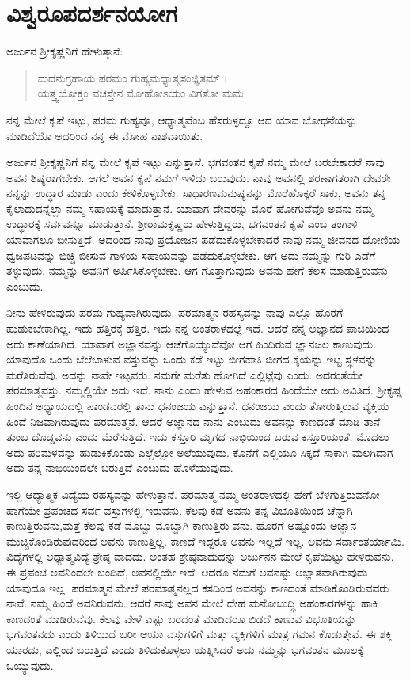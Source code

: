 
\chapter{ವಿಶ್ವರೂಪದರ್ಶನಯೋಗ}

ಅರ್ಜುನ ಶ್ರೀಕೃಷ್ಣನಿಗೆ ಹೇಳುತ್ತಾನೆ:

\begin{verse}
ಮದನುಗ್ರಹಾಯ ಪರಮಂ ಗುಹ್ಯಮಧ್ಯಾತ್ಮಸಂಜ್ಞಿತಮ್ ।\\ಯತ್ತ್ವಯೋಕ್ತಂ ವಚಸ್ತೇನ ಮೋಹೋಽಯಂ ವಿಗತೋ ಮಮ 
\end{verse}

{\small ನನ್ನ ಮೇಲೆ ಕೃಪೆ ಇಟ್ಟು, ಪರಮ ಗುಹ್ಯವೂ, ಆಧ್ಯಾತ್ಮವೆಂಬ ಹೆಸರುಳ್ಳದ್ದೂ ಆದ ಯಾವ ಬೋಧನೆಯನ್ನು ಮಾಡಿದೆಯೊ ಅದರಿಂದ ನನ್ನ ಈ ಮೋಹ ನಾಶವಾಯಿತು.}

ಅರ್ಜುನ ಶ್ರೀಕೃಷ್ಣನಿಗೆ ನನ್ನ ಮೇಲೆ ಕೃಪೆ ಇಟ್ಟು ಎನ್ನುತ್ತಾನೆ. ಭಗವಂತನ ಕೃಪೆ ನಮ್ಮ ಮೇಲೆ ಬರಬೇಕಾದರೆ ನಾವು ಅವನ ಶಿಷ್ಯರಾಗಬೇಕು. ಆಗಲೆ ಅವನ ಕೃಪೆ ನಮಗೆ ಇಳಿದು ಬರುವುದು. ನಾವು ಅವನಲ್ಲಿ ಶರಣಾಗತರಾಗಿ ದೇವರೇ ನನ್ನನ್ನು ಉದ್ಧಾರ ಮಾಡು ಎಂದು ಕೇಳಿಕೊಳ್ಳಬೇಕು. ಸಾಧಾರಣಮನುಷ್ಯನನ್ನು ಮೊರೆಹೊಕ್ಕರೆ ಸಾಕು, ಅವನು ತನ್ನ ಕೈಲಾದುದನ್ನೆಲ್ಲಾ ನಮ್ಮ ಸಹಾಯಕ್ಕೆ ಮಾಡುತ್ತಾನೆ. ಯಾವಾಗ ದೇವರನ್ನು ಮೊರೆ ಹೋಗುವೆವೊ ಅವನು ನಮ್ಮ ಉದ್ಧಾರಕ್ಕೆ ಸರ್ವವನ್ನೂ ಮಾಡುತ್ತಾನೆ. ಶ್ರೀರಾಮಕೃಷ್ಣರು ಹೇಳುತ್ತಿದ್ದರು, ಭಗವಂತನ ಕೃಪೆ ಎಂಬ ತಂಗಾಳಿ ಯಾವಾಗಲೂ ಬೀಸುತ್ತಿದೆ. ಅದರಿಂದ ನಾವು ಪ್ರಯೋಜನ ಪಡೆದುಕೊಳ್ಳಬೇಕಾದರೆ ನಾವು ನಮ್ಮ ಜೀವನದ ದೋಣಿಯ ಧ್ವಜಪಟವನ್ನು ಬಿಚ್ಚಿ ಬೀಸುವ ಗಾಳಿಯ ಸಹಾಯವನ್ನು ಪಡೆದುಕೊಳ್ಳಬೇಕು. ಆಗ ಅದು ನಮ್ಮನ್ನು ಗುರಿ ಎಡೆಗೆ ತಳ್ಳುವುದು. ನಮ್ಮನ್ನು ಅವನಿಗೆ ಅರ್ಪಿಸಿಕೊಳ್ಳಬೇಕು. ಆಗ ಗೊತ್ತಾಗುವುದು ಅವನು ಹೇಗೆ ಕೆಲಸ ಮಾಡುತ್ತಿರುವನು ಎಂಬುದು.

ನೀನು ಹೇಳಿರುವುದು ಪರಮ ಗುಹ್ಯವಾಗಿರುವುದು. ಪರಮಾತ್ಮನ ರಹಸ್ಯವನ್ನು ನಾವು ಎಲ್ಲೊ ಹೊರಗೆ ಹುಡುಕಬೇಕಾಗಿಲ್ಲ. ಇದು ಹತ್ತಿರಕ್ಕೆ ಹತ್ತಿರ. ಇದು ನನ್ನ ಅಂತರಾಳದಲ್ಲೆ ಇದೆ. ಆದರೆ ನನ್ನ ಅಜ್ಞಾನದ ಪಾಚಿಯಿಂದ ಅದು ಕಾಣೆಯಾಗಿದೆ. ಯಾವಾಗ ಅಜ್ಞಾನವನ್ನು ಆಚೆಗೊಯ್ಯುವೆವೋ ಆಗ ಹಿಂದಿರುವ ಜ್ಞಾನಜಲ ಕಾಣುವುದು. ಯಾವುದೊ ಒಂದು ಬೆಲೆಬಾಳುವ ವಸ್ತುವನ್ನು ಒಂದು ಕಡೆ ಇಟ್ಟು ಬೀಗಹಾಕಿ ಬೀಗದ ಕೈಯನ್ನು ಇಟ್ಟ ಸ್ಥಳವನ್ನು ಮರೆತಿರುವೆವು. ಅದನ್ನು ನಾವೇ ಇಟ್ಟವರು. ನಮಗೇ ಮರೆತು ಹೋಗಿದೆ ಎಲ್ಲಿಟ್ಟೆವು ಎಂದು. ಅದರಂತೆಯೇ ಪರಮಾತ್ಮವಸ್ತು. ನಮ್ಮಲ್ಲಿಯೇ ಅದು ಇದೆ. ನಾನು ಎಂದು ಹೇಳುವ ಅಹಂಕಾರದ ಹಿಂದೆಯೇ ಅದು ಅವಿತಿದೆ. ಶ್ರೀಕೃಷ್ಣ ಹಿಂದಿನ ಅಧ್ಯಾಯದಲ್ಲಿ ಪಾಂಡವರಲ್ಲಿ ತಾನು ಧನಂಜಯ ಎನ್ನುತ್ತಾನೆ. ಧನಂಜಯ ಎಂದು ತೋರುತ್ತಿರುವ ವ್ಯಕ್ತಿಯ ಹಿಂದೆ ನಿಜವಾಗಿರುವುದು ಪರಮಾತ್ಮನೆ. ಆದರೆ ಅಜ್ಞಾನದ ನಾನು ಎಂಬುದು ಅವನನ್ನು ಕಾಣದಂತೆ ಮಾಡಿ ತಾನೆ ತುಂಬ ದೊಡ್ಡವನು ಎಂದು ಮೆರೆಸುತ್ತಿದೆ. ಇದು ಕಸ್ತೂರಿ ಮೃಗದ ನಾಭಿಯಿಂದ ಬರುವ ಕಸ್ತೂರಿಯಂತೆ. ಮೊದಲು ಅದು ಪರಿಮಳವನ್ನು ಹುಡುಕಿಕೊಂಡು ಎಲ್ಲೆಲ್ಲೋ ಅಲೆಯುವುದು. ಕೊನೆಗೆ ಎಲ್ಲಿಯೂ ಸಿಕ್ಕದೆ ಸಾಕಾಗಿ ಮಲಗಿದಾಗ ಅದು ತನ್ನ ನಾಭಿಯಿಂದಲೇ ಬರುತ್ತಿದೆ ಎಂಬುದು ಹೊಳೆಯುವುದು.

ಇಲ್ಲಿ ಆಧ್ಯಾತ್ಮಿಕ ವಿದ್ಯೆಯ ರಹಸ್ಯವನ್ನು ಹೇಳುತ್ತಾನೆ. ಪರಮಾತ್ಮ ನಮ್ಮ ಅಂತರಾಳದಲ್ಲಿ ಹೇಗೆ ಬೆಳಗುತ್ತಿರುವನೋ ಹಾಗೆಯೇ ಪ್ರಪಂಚದ ಸರ್ವ ವಸ್ತುಗಳಲ್ಲಿ ಇರುವನು. ಕೆಲವು ಕಡೆ ಅವನು ತನ್ನ ವಿಭೂತಿಯಿಂದ ಚೆನ್ನಾಗಿ ಕಾಣುತ್ತಿರುವನು,ಮತ್ತೆ ಕೆಲವು ಕಡೆ ಮೊಬ್ಬು ಮೊಬ್ಬಾಗಿ ಕಾಣುತ್ತಿರು ವನು. ಹೊರಗೆ ಅಷ್ಟೊಂದು ಅಜ್ಞಾನ ಮುಚ್ಚಿಕೊಂಡಿರುವುದರಿಂದ ಅವನು ಕಾಣುತ್ತಿಲ್ಲ. ಕಾಣದೆ ಇದ್ದರೂ ಅವನು ಇಲ್ಲದೆ ಇಲ್ಲ. ಅವನು ಸರ್ವಾಂತರ್ಯಾಮಿ. ವಿದ್ಯೆಗಳಲ್ಲಿ ಅಧ್ಯಾತ್ಮವಿದ್ಯೆ ಶ್ರೇಷ್ಠ ವಾದದು. ಅಂತಹ ಶ್ರೇಷ್ಠವಾದುದನ್ನು ಅರ್ಜುನನ ಮೇಲೆ ಕೃಪೆಯಿಟ್ಟು ಹೇಳಿರುವನು. ಈ ಪ್ರಪಂಚ ಅವನಿಂದಲೇ ಬಂದಿದೆ, ಅವನಲ್ಲಿಯೇ ಇದೆ. ಆದರೂ ನಮಗೆ ಅವನಷ್ಟು ಅಜ್ಞಾತವಾಗಿರುವುದು ಯಾವುದೂ ಇಲ್ಲ. ಪರಮಾತ್ಮನ ಮೇಲೆ ಪರಮಾತ್ಮನಲ್ಲದ ಕಸದಿಂದ ಅವನನ್ನು ಕಾಣದಂತೆ ಮಾಡಿಕೊಂಡಿರುವವರು ನಾವೆ. ನಮ್ಮ ಹಿಂದೆ ಅವನಿರುವನು. ಆದರೆ ನಾವು ಅವನ ಮೇಲೆ ದೇಹ ಮನೋಬುದ್ಧಿ ಅಹಂಕಾರಗಳನ್ನು ಹಾಕಿ ಕಾಣದಂತೆ ಮಾಡಿರುವೆವು. ಕೆಲವು ವೇಳೆ ಎಷ್ಟು ಬರದಂತೆ ಮಾಡಿದರೂ ಬಿಡದೆ ಕಾಣುವ ವಿಭೂತಿಯನ್ನು ಭಗವಂತನದು ಎಂದು ತಿಳಿಯದೆ ಬರೀ ಆಯಾ ವಸ್ತುಗಳಿಗೆ ಮತ್ತು ವ್ಯಕ್ತಿಗಳಿಗೆ ಮಾತ್ರ ಗಮನ ಕೊಡುತ್ತೇವೆ. ಈ ಶಕ್ತಿ ಯಾರದು, ಎಲ್ಲಿಂದ ಬರುತ್ತಿದೆ ಎಂದು ತಿಳಿದುಕೊಳ್ಳಲು ಯತ್ನಿಸಿದರೆ ಅದು ನಮ್ಮನ್ನು ಭಗವಂತನ ಮೂಲಕ್ಕೆ ಒಯ್ಯುವುದು.

